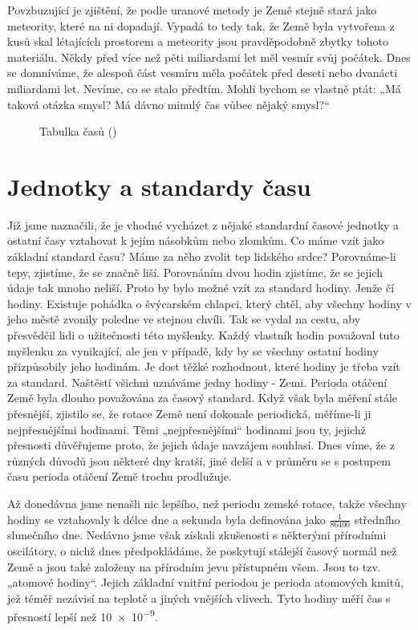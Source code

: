     Povzbuzující je zjištění, že podle uranové metody je Země stejně stará jako meteority, které na 
    ni dopadají. Vypadá to tedy tak, že Země byla vytvořena z kusů skal létajících prostorem a 
    meteority jsou pravděpodobně zbytky tohoto materiálu. Někdy před více než pěti miliardami let 
    měl vesmír svůj počátek. Dnes se domníváme, že alespoň část vesmíru měla počátek před deseti 
    nebo dvanácti miliardami let. Nevíme, co se stalo předtím. Mohli bychom se vlastně ptát: „Má 
    taková otázka smysl? Má dávno minulý čas vůbec nějaký smysl?“
    
    \begin{figure}[ht!]  %
      \centering
      \caption{Tabulka časů (\cite[s.~69]{Feynman01})}
      \label{fyz:fig075}
    \end{figure}

  \section{Jednotky a standardy času}
    Již jsme naznačili, že je vhodné vycházet z nějaké standardní časové jednotky a ostatní časy 
    vztahovat k jejím násobkům nebo zlomkům. Co máme vzít jako základní standard času? Máme za něho 
    zvolit tep lidského srdce? Porovnáme-li tepy, zjistíme, že se značně liší. Porovnáním dvou 
    hodin zjistíme, že se jejich údaje tak mnoho neliší. Proto by bylo možné vzít za standard 
    hodiny. Jenže čí hodiny. Existuje pohádka o švýcarském chlapci, který chtěl, aby všechny hodiny 
    v jeho městě zvonily poledne ve stejnou chvíli. Tak se vydal na cestu, aby přesvědčil lidi o 
    užitečnosti této myšlenky. Každý vlastník hodin považoval tuto myšlenku za vynikající, ale jen 
    v případě, kdy by se všechny ostatní hodiny přizpůsobily jeho hodinám. Je dost těžké 
    rozhodnout, které hodiny je třeba vzít za standard. Naštěstí všichni uznáváme jedny hodiny - 
    Zemi. Perioda otáčení Země byla dlouho považována za časový standard. Když však byla měření 
    stále přesnější, zjistilo se, že rotace Země není dokonale periodická, měříme-li ji 
    nejpřesnějšími hodinami. Těmi „nejpřesnějšími“ hodinami jsou ty, jejichž přesnosti důvěřujeme 
    proto, že jejich údaje navzájem souhlasí. Dnes víme, že z různých důvodů jsou některé dny 
    kratší, jiné delší a v průměru se s postupem času perioda otáčení Země trochu prodlužuje.
    
    Až donedávna jsme nenašli nic lepšího, než periodu zemské rotace, takže všechny hodiny se 
    vztahovaly k délce dne a sekunda byla definována jako \(\frac{1}{\num{86400}}\) středního 
    slunečního dne. Nedávno jsme však získali zkušenosti s některými přírodními oscilátory, o nichž 
    dnes předpokládáme, že poskytují stálejší časový normál než Země a jsou také založeny na 
    přírodním jevu přístupném všem. Jsou to tzv. „atomové hodiny“. Jejich základní vnitřní periodou 
    je perioda atomových kmitů, jež téměř nezávisí na teplotě a jiných vnějších vlivech. Tyto 
    hodiny měří čas s přesností lepší než \num{10e-9}.
    
